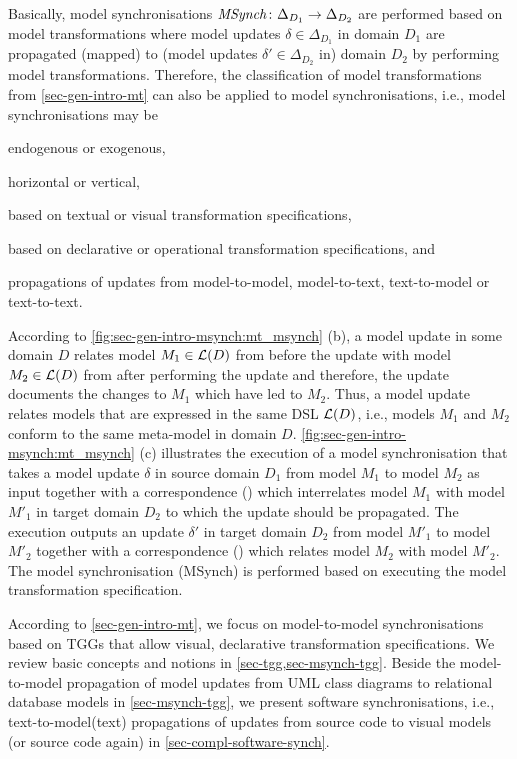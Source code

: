 Basically, model synchronisations $\mathit{MSynch}\colon \Delta_{D_1} \to \Delta_{D_2}$ are performed based on model transformations where model updates $\delta \in \Delta_{D_1}$ in domain $D_1$ are propagated (mapped) to (model updates $\delta' \in \Delta_{D_2}$ in) domain $D_2$ by performing model transformations.
Therefore, the classification of model transformations from \cref{sec-gen-intro-mt} can also be applied to model synchronisations, i.e., model synchronisations may be
\begin{enumerate*}
\item endogenous or exogenous,
\item horizontal or vertical,
\item based on textual or visual transformation specifications,
\item based on declarative or operational transformation specifications, and
\item propagations of updates from model-to-model, model-to-text, text-to-model or text-to-text.
\end{enumerate*}

According to \cref{fig:sec-gen-intro-msynch:mt_msynch} (b), a model update in some domain $D$ relates model $M_1 \in \mathcal{L}(D)$ from before the update with model $M_2 \in \mathcal{L}(D)$ from after performing the update and therefore, the update documents the changes to $M_1$ which have led to $M_2$.
Thus, a model update relates models that are expressed in the same DSL $\mathcal{L}(D)$, i.e., models $M_1$ and $M_2$ conform to the same meta-model in domain $D$.
\cref{fig:sec-gen-intro-msynch:mt_msynch} (c) illustrates the execution of a model synchronisation that takes a model update $\delta$ in source domain $D_1$ from model $M_1$ to model $M_2$ as input together with a correspondence () which interrelates model $M_1$ with model $M'_1$ in target domain $D_2$ to which the update should be propagated.
The execution outputs an update $\delta'$ in target domain $D_2$ from model $M'_1$ to model $M'_2$ together with a correspondence () which relates model $M_2$ with model $M'_2$.
The model synchronisation (MSynch) is performed based on executing the model transformation specification.

According to \cref{sec-gen-intro-mt}, we focus on model-to-model synchronisations based on TGGs that allow visual, declarative transformation specifications.
We review basic concepts and notions in \cref{sec-tgg,sec-msynch-tgg}.
Beside the model-to-model propagation of model updates from UML class diagrams to relational database models in \cref{sec-msynch-tgg}, we present software synchronisations, i.e., text-to-model(text) propagations of updates from source code to visual models (or source code again) in \cref{sec-compl-software-synch}.
